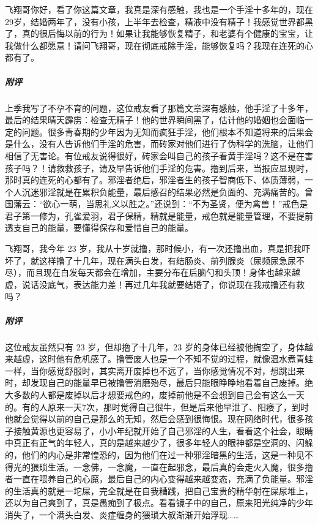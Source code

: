 \begin{case}
    飞翔哥你好，看了你这篇文章，我真是深有感触，我也是一个手淫十多年的，现在29岁，结婚两年了，没有小孩，上半年去检查，精液中没有精子！我感觉世界都黑了，真的很后悔以前的行为！如果让我能够恢复精子，和老婆有个健康的宝宝，让我做什么都愿意！请问飞翔哥，现在彻底戒除手淫，能够恢复吗？我现在连死的心都有了。
    \subparagraph{附评} 上季我写了不孕不育的问题，这位戒友看了那篇文章深有感触，他手淫了十多年，最后的结果晴天霹雳：检查无精子！他的世界瞬间黑了，估计他的婚姻也会面临一定的问题。很多青春期的少年因为无知而疯狂手淫，他们根本不知道将来的后果会是什么，没有人告诉他们手淫的危害，而砖家对他们进行了伪科学的洗脑，让他们相信了无害论。有位戒友说得很好，砖家会叫自己的孩子看黄手淫吗？这不是在害孩子吗？！请救救孩子，请及早告诉他们手淫的危害。撸到后来，当报应显现时，那时真的连死的心都有了。邪淫者绝后，邪淫者生的孩子智商低下、体质薄弱，一个人沉迷邪淫就是在累积负能量，最后感召的结果必然是负面的、充满痛苦的。曾国藩云：“欲心一萌，当思礼义以胜之。”还说到：“不为圣贤，便为禽兽！”戒色是君子第一修为，孔雀爱羽，君子保精，精就是能量，戒色就是能量管理，不要提前透支自己的能量，要懂得保存和爱惜自己的能量。
\end{case}

\begin{case}
    飞翔哥，我今年 23 岁，我从十岁就撸，那时候小，有一次还撸出血，真是把我吓坏了，就这样撸了十几年，现在满头白发，有结肠炎、前列腺炎（尿频尿急尿不尽），而且现在白发每天都会在增加，主要分布在后脑勺和头顶！身体也越来越虚，说话没底气，表达能力差！再过几年我就要结婚了，你说现在我戒撸还有救吗？
    \subparagraph{附评} 这位戒友虽然只有 23 岁，但却撸了十几年，23 岁的身体已经被他掏空了，身体越来越虚，这时他有危机感了。撸管废人也是一个不知不觉的过程，就像温水煮青蛙一样，当你感觉舒服时，其实离开废掉也不远了，当你感觉情况不对，想跳出来时，却发现自己的能量早已被撸管消磨殆尽，最后只能眼睁睁地看着自己废掉。绝大多数的人都是废掉以后才想要戒色的，废掉前他是不会想到自己会有这么一天的。有的人原来一天7次，那时觉得自己很牛，但是后来他早泄了、阳痿了，到时他就会觉得以前的自己是那么的无知，然后会感到很悔恨。现在网络时代，很多孩子接触黄源也更容易了，小小年纪就开始了自己邪淫的人生，看看这个社会，眼睛中真正有正气的年轻人，真的是越来越少了，很多年轻人的眼神都是空洞的、闪躲的，他们的内心是非常惶恐的，因为他们在过一种邪淫暗黑的生活，这是一种见不得光的猥琐生活。一念佛，一念魔，一直在起邪念，最后真的会走火入魔，很多撸者一直在喂养自己的心魔，最后自己的内心变得越来越变态，充满了负能量。邪淫的生活真的就是一坨屎，完全就是在自我糟践，把自己宝贵的精华射在屎尿堆上，还以为自己爽到了，真是愚痴到了极点。看看镜子中的自己，原来阳光纯净的少年消失了，一个满头白发、炎症缠身的猥琐大叔渐渐开始浮现……
\end{case}

